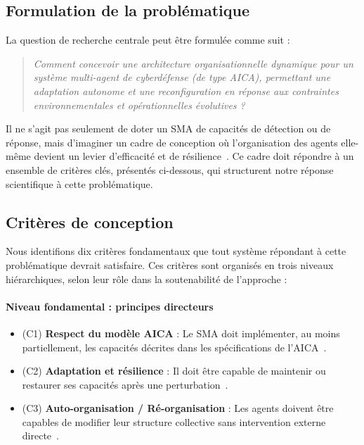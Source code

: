 \documentclass[ twoside,openright,titlepage,numbers=noenddot,headinclude,%
                footinclude=true,cleardoublepage=empty,abstractoff, %
                BCOR=5mm,paper=a4,fontsize=11pt,%
                french,american,%
                ]{scrreprt}
\begin{document}
\subsection*{Formulation de la problématique}

La question de recherche centrale peut être formulée comme suit :

\begin{quote}
\emph{Comment concevoir une architecture organisationnelle dynamique pour un système multi-agent de cyberdéfense (de type AICA), permettant une adaptation autonome et une reconfiguration en réponse aux contraintes environnementales et opérationnelles évolutives ?}
\end{quote}

Il ne s'agit pas seulement de doter un SMA de capacités de détection ou de réponse, mais d'imaginer un cadre de conception où l'organisation des agents elle-même devient un levier d'efficacité et de résilience~\cite{Picard2003, DiMarzoSerugendo2005}. Ce cadre doit répondre à un ensemble de critères clés, présentés ci-dessous, qui structurent notre réponse scientifique à cette problématique.

\subsection*{Critères de conception}

Nous identifions dix critères fondamentaux que tout système répondant à cette problématique devrait satisfaire. Ces critères sont organisés en trois niveaux hiérarchiques, selon leur rôle dans la soutenabilité de l'approche :

\paragraph{Niveau fondamental : principes directeurs}
\begin{itemize}
    \item (C1) \textbf{Respect du modèle AICA} : Le SMA doit implémenter, au moins partiellement, les capacités décrites dans les spécifications de l'AICA~\cite{AICAGuide2022}.
    \item (C2) \textbf{Adaptation et résilience} : Il doit être capable de maintenir ou restaurer ses capacités après une perturbation~\cite{Bodeau2011}.
    \item (C3) \textbf{Auto-organisation / Ré-organisation} : Les agents doivent être capables de modifier leur structure collective sans intervention externe directe~\cite{DiMarzoSerugendo2005}.
\end{itemize}
\end{document}

